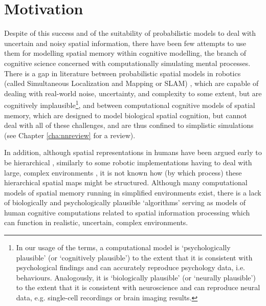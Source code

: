 \section{Motivation}
\label{sec:intro:motivation}

Despite of this success and of the suitability of probabilistic models to deal with uncertain and noisy spatial information, there have been few attempts to use them for modelling spatial memory within cognitive modelling, the branch of cognitive science concerned with computationally simulating mental processes. There is a gap in literature between probabilistic spatial models in robotics (called Simultaneous Localization and Mapping or SLAM) \citep{thrun2008simultaneous}, which are capable of dealing with real-world noise, uncertainty, and complexity to some extent, but are cognitively implausible\footnote{In our usage of the terms, a computational model is `psychologically plausible' (or `cognitively plausible') to the extent that it is consistent with psychological findings and can accurately reproduce psychology data, i.e. behaviours. Analogously, it is `biologically plausible' (or `neurally plausible') to the extent that it is consistent with neuroscience and can reproduce neural data, e.g. single-cell recordings or brain imaging results.}, and between computational cognitive models of spatial memory, which are designed to model biological spatial cognition, but cannot deal with all of these challenges, and are thus confined to simplistic simulations (see Chapter \ref{cha:nnreview} for a review). 


In addition, although spatial representations in humans have been argued early to be hierarchical \citep{hirtle1985evidence, mcnamara1989subjective, greenauer2010micro}, similarly to some robotic implementations having to deal with large, complex environments \citep{kuipers2000spatial, wurm2010octomap}, it is not known how (by which process) these hierarchical spatial maps might be structured. Although many computational models of spatial memory running in simplified environments exist, there is a lack of biologically and psychologically plausible `algorithms' serving as models of human cognitive computations related to spatial information processing which can function in realistic, uncertain, complex environments.

